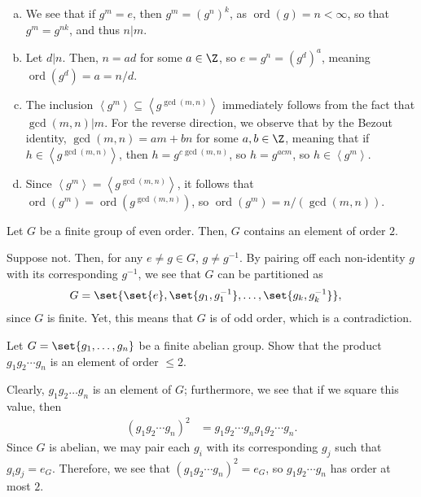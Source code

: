 \documentclass[10pt]{mypackage}
\begin{document}
\begin{solution}\hfill
  \begin{enumerate}[(a)]
    \item We see that if $g^{m} = e$, then $g^{m} = \left( g^{n} \right)^{k}$, as $\operatorname{ord}\left( g \right) = n < \infty$, so that $g^{m} = g^{nk}$, and thus $n | m$.
    \item Let $d | n$. Then, $n = ad$ for some $a\in \Z$, so $e = g^{n} = \left( g^{d} \right)^{a}$, meaning $\operatorname{ord}\left( g^{d} \right) = a = n/d$.
    \item The inclusion $ \left\langle g^{m} \right\rangle \subseteq \left\langle g^{\gcd\left( m,n \right)} \right\rangle $ immediately follows from the fact that $\gcd\left( m,n \right) | m$. For the reverse direction, we observe that by the Bezout identity, $\gcd\left( m,n \right) = am + bn$ for some $a,b\in \Z$, meaning that if $h\in \left\langle g^{\gcd\left( m,n \right)} \right\rangle$, then $h = g^{c\gcd\left( m,n \right)}$, so $h = g^{acm}$, so $h\in \left\langle g^{m} \right\rangle$.
    \item Since $\left\langle g^{m} \right\rangle = \left\langle g^{\gcd\left( m,n \right)} \right\rangle$, it follows that $\operatorname{ord}\left( g^{ m } \right) = \operatorname{ord}\left( g^{\gcd\left( m,n \right)} \right)$, so $\operatorname{ord}\left( g^{m} \right) = n/\left( \gcd\left( m,n \right) \right)$.
  \end{enumerate}
\end{solution}
\begin{problem}[Problem 6]
  Let $G$ be a finite group of even order. Then, $G$ contains an element of order $2$.
\end{problem}
\begin{solution}
  Suppose not. Then, for any $e\neq g\in G$, $g \neq g^{-1}$. By pairing off each non-identity $g$ with its corresponding $g^{-1}$, we see that $G$ can be partitioned as
  \begin{align*}
    G &= \set{\set{e},\set{g_1,g_1^{-1}},\dots,\set{g_{k},g_{k}^{-1}}},
  \end{align*}
  since $G$ is finite. Yet, this means that $G$ is of odd order, which is a contradiction.
\end{solution}
\begin{problem}[Problem 7]
  Let $G = \set{g_1,\dots,g_n}$ be a finite abelian group. Show that the product $g_1g_2\cdots g_n$ is an element of order $\leq 2$.
\end{problem}
\begin{solution}
  Clearly, $g_1g_2\dots g_n$ is an element of $G$; furthermore, we see that if we square this value, then
  \begin{align*}
    \left( g_1g_2\cdots g_n \right)^2 &= g_1g_2\cdots g_n g_1g_2\cdots g_n.
  \end{align*}
  Since $G$ is abelian, we may pair each $g_i$ with its corresponding $g_j$ such that $g_ig_j = e_{G}$. Therefore, we see that $\left( g_1g_2\cdots g_n \right)^2 = e_G$, so $g_1g_2\cdots g_n$ has order at most $2$.
\end{solution}
\end{document}
